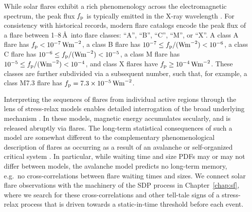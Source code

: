 While solar flares exhibit a rich phenomenology across the electromagnetic spectrum, the peak flux $f_{\rm p}$ is typically emitted in the X-ray wavelength \citep{Fletcher2011,Benz2016}. For consistency with historical records, modern flare catalogs encode the peak flux of a flare between 1--8\,\AA\ into flare classes: ``A'', ``B'', ``C'', ``M'', or ``X''. A class A flare has $f_{\rm p} < 10^{-7}\,\textrm{Wm}^{-2}$, a class B flare has $10^{-7} \leq f_{\rm p} / (\textrm{Wm}^{-2}) < 10^{-6}$, a class C flare has $10^{-6} \leq f_{\rm p} / (\textrm{Wm}^{-2}) < 10^{-5}$, a class M flare has $10^{-5} \leq f_{\rm p} / (\textrm{Wm}^{-2}) < 10^{-4}$, and class X flares have $f_{\rm p} \geq 10^{-4}\,\textrm{Wm}^{-2}$. These classes are further subdivided via a subsequent number, such that, for example, a class M7.3 flare has $f_{\rm p} = 7.3\times 10^{-5}\,\textrm{Wm}^{-2}$.

Interpreting the sequences of flares from individual active regions through the lens of stress-relax models enables detailed interrogation of the broad underlying mechanism \citep{Rosner1978,Wheatland1998,Wheatland2000corr,Wheatland2008,Kanazir2010,Hudson2019}. In these models, magnetic energy accumulates secularly, and is released abruptly via flares. The long-term statistical consequences of such a model are somewhat different to the complementary phenomenological description of flares as occurring as a result of an avalanche or self-organized critical system \citep{Lu1991,Lu1993,Lu1995a,Charbonneau2001,Thibeault2022}. In particular, while waiting time and size PDFs may or may not differ between models, the avalanche model predicts no long-term memory, e.g.~no cross-correlations between flare waiting times and sizes. We connect solar flare observations with the machinery of the SDP process in Chapter~\ref{chap:sf}, where we search for these cross-correlations and other tell-tale signs of a stress-relax process that is driven towards a static-in-time threshold before each event.

